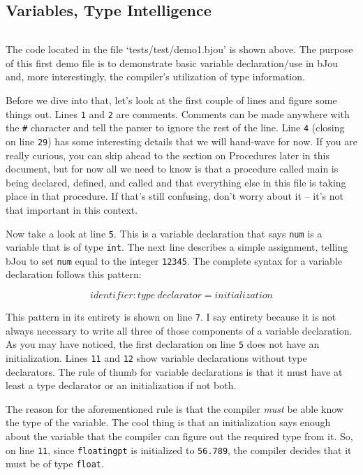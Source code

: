 \documentclass[12pt]{article}
\begin{document}
	\subsection*{Variables, Type Intelligence}
		\begin{centering}
			\inputminted[breaklines, fontsize=\small, baselinestretch=0.8, frame=lines, linenos]{bash}{"../tests/test/demo1.bjou"}
		\end{centering}

		\newpage
		The code located in the file `tests/test/demo1.bjou' is shown above. The purpose of this first demo file is to demonstrate basic variable declaration/use in bJou and, more interestingly, the compiler's utilization of type information.
	
		Before we dive into that, let's look at the first couple of lines and figure some things out. Lines \texttt{1} and \texttt{2} are comments. Comments can be made anywhere with the \texttt{\#} character and tell the parser to ignore the rest of the line. Line \texttt{4} (closing on line \texttt{29}) has some interesting details that we will hand-wave for now. If you are really curious, you can skip ahead to the section on Procedures later in this document, but for now all we need to know is that a procedure called main is being declared, defined, and called and that everything else in this file is taking place in that procedure. If that's still confusing, don't worry about it -- it's not that important in this context.

		Now take a look at line \texttt{5}. This is a variable declaration that says \texttt{num} is a variable that is of type \texttt{int}. The next line describes a simple assignment, telling bJou to set \texttt{num} equal to the integer \texttt{12345}. The complete syntax for a variable declaration follows this pattern:
	
		$$identifier : type\ declarator = initialization$$
		
		This pattern in its entirety is shown on line \texttt{7}. I say entirety because it is not always necessary to write all three of those components of a variable declaration. As you may have noticed, the first declaration on line \texttt{5} does not have an initialization. Lines \texttt{11} and \texttt{12} show variable declarations without type declarators. The rule of thumb for variable declarations is that it must have at least a type declarator or an initialization if not both.
	
		The reason for the aforementioned rule is that the compiler \emph{must} be able know the type of the variable. The cool thing is that an initialization says enough about the variable that the compiler can figure out the required type from it. So, on line \texttt{11}, since \texttt{floatingpt} is initialized to \texttt{56.789}, the compiler decides that it must be of type \texttt{float}.
	
\end{document}
